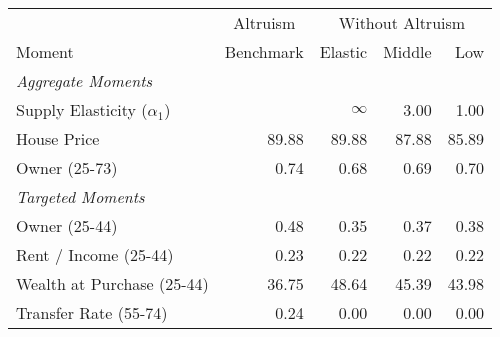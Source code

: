 \begin{tabular}{lrrrr}
 \toprule & \multicolumn{1}{c}{Altruism} & \multicolumn{3}{c}{Without Altruism}  \\  \cmidrule(lr){2-2} \cmidrule(lr){3-5} 

Moment & Benchmark & Elastic & Middle & Low\\
\midrule
\textit{Aggregate Moments} &  &  &  & \\
\;Supply Elasticity ($\alpha_1$) &  & $ \infty $ & 3.00 & 1.00\\
\;House Price & 89.88 & 89.88 & 87.88 & 85.89\\
\;Owner (25-73) & 0.74 & 0.68 & 0.69 & 0.70\\
\textit{Targeted Moments} &  &  &  & \\
\;Owner (25-44) & 0.48 & 0.35 & 0.37 & 0.38\\
\;Rent / Income (25-44) & 0.23 & 0.22 & 0.22 & 0.22\\
\;Wealth at Purchase (25-44) & 36.75 & 48.64 & 45.39 & 43.98\\
\;Transfer Rate (55-74) & 0.24 & 0.00 & 0.00 & 0.00\\
\bottomrule
\end{tabular}
